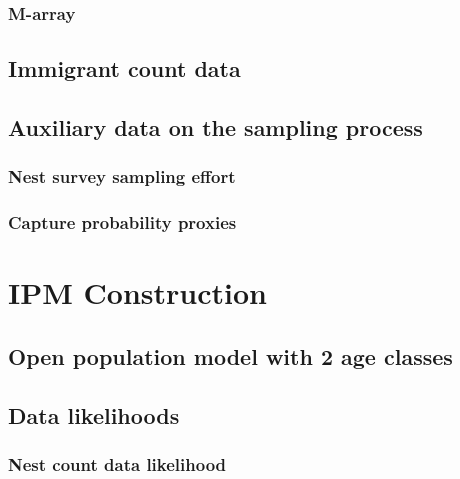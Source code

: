 \documentclass[
]{book}
\begin{document}
\hypertarget{m-array}{%
\subsection{M-array}\label{m-array}}

\hypertarget{immigrant-count-data}{%
\section{Immigrant count data}\label{immigrant-count-data}}

\hypertarget{auxiliary-data-on-the-sampling-process}{%
\section{Auxiliary data on the sampling process}\label{auxiliary-data-on-the-sampling-process}}

\hypertarget{nest-survey-sampling-effort}{%
\subsection{Nest survey sampling effort}\label{nest-survey-sampling-effort}}

\hypertarget{capture-probability-proxies}{%
\subsection{Capture probability proxies}\label{capture-probability-proxies}}

\hypertarget{IPMCon}{%
\chapter{IPM Construction}\label{IPMCon}}

\hypertarget{open-population-model-with-2-age-classes}{%
\section{Open population model with 2 age classes}\label{open-population-model-with-2-age-classes}}

\hypertarget{data-likelihoods}{%
\section{Data likelihoods}\label{data-likelihoods}}

\hypertarget{nest-count-data-likelihood}{%
\subsection{Nest count data likelihood}\label{nest-count-data-likelihood}}
\end{document}
